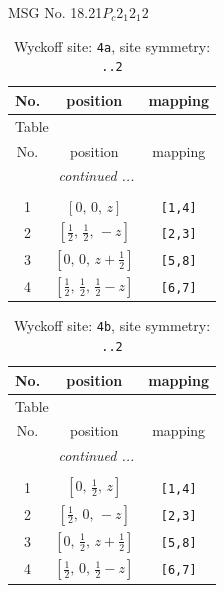 \documentclass[fleqn,8pt]{jsarticle}
\begin{document}
\setcounter{MaxMatrixCols}{32}

\renewcommand{\tablename}{Table~}
\renewcommand{\figurename}{Figure~}
\begin{center}
\LARGE
MSG No. 18.21\quad$P_{c}2_{1}2_{1}2$
\end{center}
\renewcommand{\arraystretch}{1.2}
\begin{longtable}{ccc}
\caption{Wyckoff site: {\tt 4a}, site symmetry: {\tt ..2}}
 \\
 \hline \hline
No. & position & mapping \\ \hline \endfirsthead

\multicolumn{2}{l}{\tablename\ \thetable{}} \\
 \hline \hline
No. & position & mapping \\ \hline \endhead

 \hline \hline
\multicolumn{2}{r}{\footnotesize\it continued ...} \\ \endfoot

 \hline \hline
\multicolumn{2}{r}{} \\ \endlastfoot

1 & $\left[ 0,\, 0,\, z \right]$ & {\tt [1,4]} \\ \hline
2 & $\left[ \frac{1}{2},\, \frac{1}{2},\, - z \right]$ & {\tt [2,3]} \\ \hline
3 & $\left[ 0,\, 0,\, z + \frac{1}{2} \right]$ & {\tt [5,8]} \\ \hline
4 & $\left[ \frac{1}{2},\, \frac{1}{2},\, \frac{1}{2} - z \right]$ & {\tt [6,7]} \\
\end{longtable}
\renewcommand{\arraystretch}{1.2}
\begin{longtable}{ccc}
\caption{Wyckoff site: {\tt 4b}, site symmetry: {\tt ..2}}
 \\
 \hline \hline
No. & position & mapping \\ \hline \endfirsthead

\multicolumn{2}{l}{\tablename\ \thetable{}} \\
 \hline \hline
No. & position & mapping \\ \hline \endhead

 \hline \hline
\multicolumn{2}{r}{\footnotesize\it continued ...} \\ \endfoot

 \hline \hline
\multicolumn{2}{r}{} \\ \endlastfoot

1 & $\left[ 0,\, \frac{1}{2},\, z \right]$ & {\tt [1,4]} \\ \hline
2 & $\left[ \frac{1}{2},\, 0,\, - z \right]$ & {\tt [2,3]} \\ \hline
3 & $\left[ 0,\, \frac{1}{2},\, z + \frac{1}{2} \right]$ & {\tt [5,8]} \\ \hline
4 & $\left[ \frac{1}{2},\, 0,\, \frac{1}{2} - z \right]$ & {\tt [6,7]} \\
\end{longtable}
\end{document}
